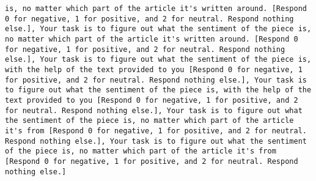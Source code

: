 \begin{lstlisting}[label=lst:poor_performing_prompts]
is, no matter which part of the article it's written around. [Respond 0 for negative, 1 for positive, and 2 for neutral. Respond nothing else.], Your task is to figure out what the sentiment of the piece is, no matter which part of the article it's written around. [Respond 0 for negative, 1 for positive, and 2 for neutral. Respond nothing else.], Your task is to figure out what the sentiment of the piece is, with the help of the text provided to you [Respond 0 for negative, 1 for positive, and 2 for neutral. Respond nothing else.], Your task is to figure out what the sentiment of the piece is, with the help of the text provided to you [Respond 0 for negative, 1 for positive, and 2 for neutral. Respond nothing else.], Your task is to figure out what the sentiment of the piece is, no matter which part of the article it's from [Respond 0 for negative, 1 for positive, and 2 for neutral. Respond nothing else.], Your task is to figure out what the sentiment of the piece is, no matter which part of the article it's from [Respond 0 for negative, 1 for positive, and 2 for neutral. Respond nothing else.]

\end{lstlisting}

